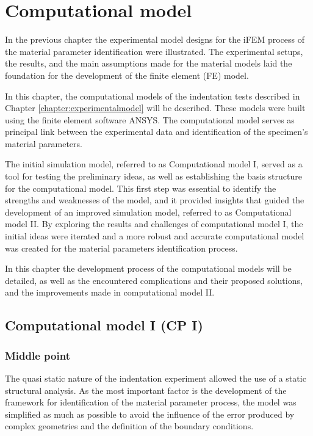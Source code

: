 
\chapter{Computational model} %
\label{chapter:computationalmodel} %

In the previous chapter the experimental model designs for the iFEM process of the material 
parameter identification were illustrated. The experimental setups, the results, and the main assumptions 
made for the material models laid the foundation for the development of the finite element (FE) model.

In this chapter, the computational models of the indentation tests described in Chapter \ref{chapter:experimentalmodel} 
will be described. These models were built using the finite element software ANSYS. 
The computational model serves as principal link between the experimental data and identification of the 
specimen's material parameters.  

The initial simulation model, referred to as Computational model I, served as a tool 
for testing the preliminary ideas, as well as establishing the basis structure for 
the computational model. This first step was essential to identify the strengths and 
weaknesses of the model, and it provided insights that guided the development of an 
improved simulation model, referred to as Computational model II. By exploring the 
results and challenges of computational model I, the initial ideas 
were iterated and a more robust and accurate computational model was created for the material
parameters identification process.

In this chapter the development process of the computational models will be detailed, 
as well as the encountered complications and their proposed solutions, 
and the improvements made in computational model II.

\section{Computational model I (CP I)}
\subsection{Middle point}
The quasi static nature of the indentation experiment allowed the use of a static 
structural analysis. As the most important factor is the development of the framework for identification 
of the material parameter process, the model was simplified as much as possible to avoid the influence 
of the error produced by complex geometries and the definition of the boundary conditions.

